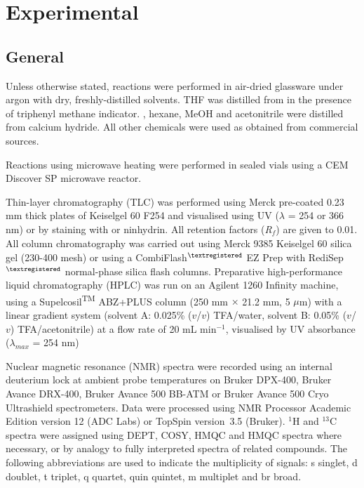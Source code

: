 \newpage

\section{Experimental}

\subsection{General}

Unless otherwise stated, reactions were performed in air-dried glassware under argon with dry, freshly-distilled solvents. THF was distilled from  in the presence of triphenyl methane indicator. , hexane, MeOH and acetonitrile were distilled from calcium hydride. All other chemicals were used as obtained from commercial sources.

Reactions using microwave heating were performed in sealed vials using a CEM Discover SP microwave reactor. 

Thin-layer chromatography (TLC) was performed using Merck pre-coated 0.23 mm thick plates of Keiselgel 60 F254 and visualised using UV ($\lambda$ = 254 or 366 nm) or by staining with  or ninhydrin. 
All retention factors (\textit{R}$_\textit{f}$) are given to 0.01. 
All column chromatography was carried out using Merck 9385 Keiselgel 60 silica gel (230-400 mesh) or using a CombiFlash$^{\tiny{\textregistered}}$ EZ Prep with RediSep$^{\tiny{\textregistered}}$ normal-phase silica flash columns. 
Preparative high-performance liquid chromatography (HPLC) was run on an Agilent 1260 Infinity machine, using a Supelcosil\textsuperscript{TM} ABZ+PLUS column (250 mm $\times$ 21.2 mm, 5 $\mu$m) with a linear gradient system (solvent A: 0.025\% ($v$/$v$) TFA/water, solvent B: 0.05\% ($v$/$v$) TFA/acetonitrile) at a flow rate of 20 mL min$^{-1}$, visualised by UV absorbance ($\lambda_{max}$ = 254 nm)

Nuclear magnetic resonance (NMR) spectra were recorded using an internal deuterium lock at ambient probe temperatures on Bruker DPX-400, Bruker Avance DRX-400, Bruker Avance 500 BB-ATM or Bruker Avance 500 Cryo Ultrashield spectrometers. Data were processed using NMR Processor Academic Edition version 12 (ADC Labs) or TopSpin version 3.5 (Bruker). $^1$H and $^13$C spectra were assigned using DEPT, COSY, HMQC and HMQC spectra where necessary, or by analogy to fully interpreted spectra of related compounds. The following abbreviations are used to indicate the multiplicity of signals: s singlet, d doublet, t triplet, q quartet, quin quintet, m multiplet and br broad.

